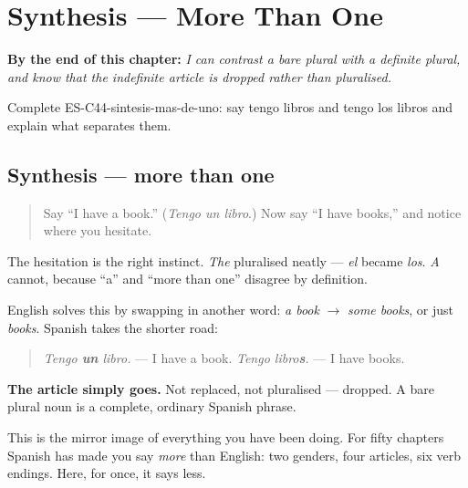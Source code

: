 
\chapter{Synthesis --- More Than One}
\label{ch:synthesis-more-than-one}

\begin{chapteropening}
\textbf{By the end of this chapter:} \emph{I can contrast a bare plural with a definite plural, and know that the indefinite article is dropped rather than pluralised.}

Complete ES-C44-sintesis-mas-de-uno: say tengo libros and tengo los libros and explain what separates them.
\end{chapteropening}

\section[Practice]{Synthesis — more than one}

\label{lesson:ES-C44-sintesis-mas-de-uno}



\begin{quote}
Say \textquotedblleft{}I have a book.\textquotedblright{} (\emph{Tengo un libro}.) Now say \textquotedblleft{}I have books,\textquotedblright{} and notice where you hesitate.
\end{quote}

\begin{grammarlens}[title={Grammar Lens: the article that leaves}]
The hesitation is the right instinct. \emph{The} pluralised neatly — \emph{el} became \emph{los}. \emph{A} cannot, because \textquotedblleft{}a\textquotedblright{} and \textquotedblleft{}more than one\textquotedblright{} disagree by definition.

English solves this by swapping in another word: \emph{a book} $\to$ \emph{some books}, or just \emph{books}. Spanish takes the shorter road:

\begin{quote}
\emph{Tengo \textbf{un} libro.} — I have a book. \emph{Tengo libro\textbf{s}.} — I have books.
\end{quote}

\textbf{The article simply goes.} Not replaced, not pluralised — dropped. A bare plural noun is a complete, ordinary Spanish phrase.

This is the mirror image of everything you have been doing. For fifty chapters Spanish has made you say \emph{more} than English: two genders, four articles, six verb endings. Here, for once, it says less.
\end{grammarlens}

